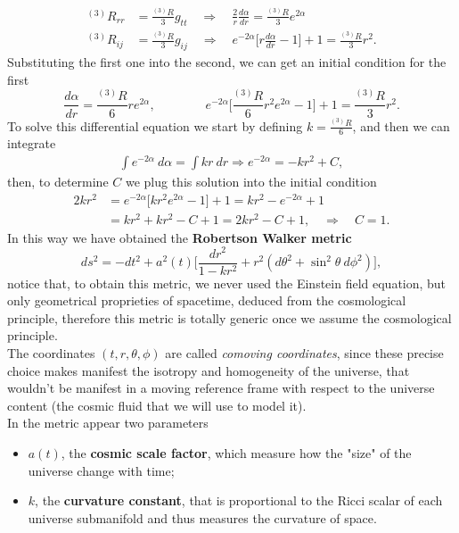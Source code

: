 \begin{align*}
    ^{(3)}R_{rr}&=\frac{^{(3)}R}{3}g_{tt}\quad\Rightarrow\quad\boxed{\frac{2}{r}\frac{d\alpha}{dr}=\frac{^{(3)}R}{3}e^{2\alpha}}\\ ^{(3)}R_{ij}&=\frac{^{(3)}R}{3}g_{ij}\quad\Rightarrow\quad \boxed{e^{-2\alpha}\bigg[r\frac{d\alpha}{dr}-1\bigg]+1=\frac{^{(3)}R}{3}r^2}.
\end{align*}
Substituting the first one into the second, we can get an initial condition for the first
\begin{equation}
    \frac{d\alpha}{dr}=\frac{^{(3)}R}{6}re^{2\alpha},\qquad\qquad e^{-2\alpha}\bigg[\frac{^{(3)}R}{6}r^2e^{2\alpha}-1\bigg]+1=\frac{^{(3)}R}{3}r^2.
\end{equation}
To solve this differential equation we start by defining $k=\frac{^{(3)}R}{6}$, and then we can integrate
\begin{align}
    \int e^{-2\alpha}\ d\alpha=\int kr\ dr \Rightarrow e^{-2\alpha}=-kr^2+C,
\end{align}
then, to determine $C$ we plug this solution into the initial condition
\begin{align*}
    2kr^2&=e^{-2\alpha}\bigg[kr^2e^{2\alpha}-1\bigg]+1=kr^2-e^{-2\alpha}+1\\
       &=kr^2+kr^2-C+1=2kr^2-C+1,\quad \Rightarrow\quad C=1.
\end{align*}    
In this way we have obtained the \textbf{Robertson Walker metric}
\begin{equation}\label{RWMetric}
    ds^2=-dt^2+a^2(t)\bigg[\frac{dr^2}{1-kr^2}+r^2(d\theta^2+\sin^2\theta\ d\phi^2)\bigg],
\end{equation}
notice that, to obtain this metric, we never used the Einstein field equation, but only geometrical proprieties of spacetime, deduced from the cosmological principle, therefore this metric is totally generic once we assume the cosmological principle.\\
The coordinates $(t,r,\theta,\phi)$ are called \emph{comoving coordinates}, since these precise choice makes manifest the isotropy and homogeneity of the universe, that wouldn't be manifest in a moving reference frame with respect to the universe content (the cosmic fluid that we will use to model it).\\
In the metric appear two parameters
\begin{itemize}
    \item $a(t)$, the \textbf{cosmic scale factor}, which measure how the "size" of the universe change with time;
    \item $k$, the \textbf{curvature constant}, that is proportional to the Ricci scalar of each universe submanifold and thus measures the curvature of space.
\end{itemize}
